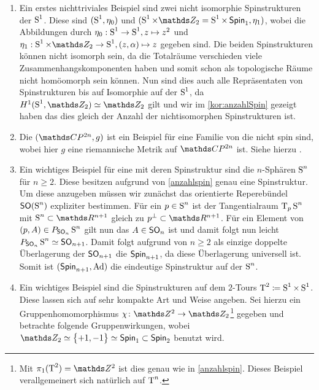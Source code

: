 \begin{Bsp}
\begin{enumerate}[(1)]
  \item \label{Bsp:spinstrukturAufsphere} Ein erstes nichttriviales Beispiel sind zwei nicht isomorphie
    Spinstrukturen der $\S^1$. Diese sind $(\S^1 , \eta_0)$ und
    $(\S^1 \times \Z_2 = \S^1 \times \spin_1 , \eta_1)$, wobei die
    Abbildungen durch $\eta_0 : \S^1 \rightarrow \S^1 , z \mapsto z^2$
    und
    $\eta_1 : \S^1 \times \Z_2 \rightarrow \S^1 , (z,\alpha) \mapsto
    z$
    gegeben sind. Die beiden Spinstrukturen können nicht isomorph
    sein, da die Totalräume verschieden viele Zusammenhangskomponenten
    haben und somit schon als topologische Räume nicht homöomorph sein
    können. Nun sind dies auch alle Repräsentaten von
    Spinstrukturen bis auf Isomorphie auf der $ \S^1 $, da $ H^1(\S^1,\Z_2) \simeq \Z_2 $ gilt und wir im \cref{kor:anzahlSpin}
    gezeigt haben das dies gleich der Anzahl der nichtisomorphen
    Spinstrukturen ist.
  \item Die $(\CP^{2n},g)$ ist ein Beispiel für eine Familie von
    \RMFen die nicht spin sind, wobei hier $g$ eine riemannische
    Metrik auf $\CP^{2n}$ ist. Siehe hierzu \cite[Seite 96]{BHMMM15}.
    
  \item \label{SpinstrSphäre}Ein wichtiges Beispiel für eine \RMF mit deren Spinstruktur
    sind die $ n $-Sphären $\S^n$ für $ n \geq 2 $. Diese besitzen  
    aufgrund von \cref{anzahlspin} genau eine Spinstruktur. Um 
    diese anzugeben müssen wir zunächst das orientierte Reperebündel $ \so(\S^n) $ expliziter bestimmen. Für ein $ p\in\S^n $ ist der Tangentialraum $ \tang{p}{\S^n} $ mit $ \S^n\subset\R^{n+1} $ 
    gleich zu $ p^\bot\subset\R^{n+1} $. Für ein Element von $ (p,A)\in \Ph{\so_n}{\S^n} $ gilt nun das $ A \in\so_n$ ist und damit folgt
    nun leicht $ \Ph{\so_n}{\S^n} \simeq \so_{n+1} $. Damit folgt
    aufgrund von $ n\geq 2 $ als einzige doppelte Überlagerung der
    $ \so_{n+1} $ die $ \spin_{n+1} $, da diese Überlagerung universell ist. Somit ist $ (\spin_{n+1},\Ad) $ die eindeutige
    Spinstruktur auf der $ \S^n $.
  \item Ein wichtiges Beispiel sind die Spinstrukturen auf dem $ 2 $-Tours $ \TT^2 \coloneqq \S^1\times\S^1$. Diese lassen sich auf sehr
  kompakte Art und Weise angeben.
  Sei hierzu ein Gruppenhomomorphismus $ \abb{\chi}{\Z^2}{\Z_2}$\footnote{Mit $ \pi_1(\TT^2)=\Z^2 $ ist dies genau wie in \cref{anzahlspin}. Dieses Beispiel verallgemeinert sich natürlich auf $ \TT^n $.}  gegeben
  und betrachte folgende Gruppenwirkungen, wobei $ \Z_2\simeq\sset{+1,-1}\simeq\spin_1 \subset\spin_2 $ benutzt wird.



\end{enumerate}
\end{Bsp}
